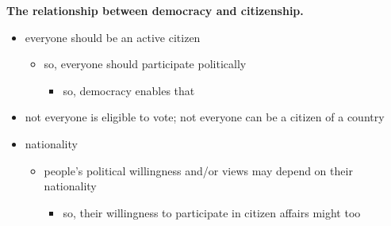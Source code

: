 \documentclass{article}
\begin{document}
	\textbf{The relationship between democracy and citizenship.}
	
	\begin{itemize}
		\item{everyone should be an active citizen}
		\begin{itemize}
			\item{so, everyone should participate politically}
			\begin{itemize}
				\item{so, democracy enables that}
			\end{itemize}
		\end{itemize}
	\end{itemize}
	
	\begin{itemize}
		\item{not everyone is eligible to vote; not everyone can be a citizen of a country}
	\end{itemize}
	
	\begin{itemize}
		\item{nationality}
		\begin{itemize}
			\item{people's political willingness and/or views may depend on their\\ nationality}
			\begin{itemize}
				\item{so, their willingness to participate in citizen affairs might too}
			\end{itemize}
		\end{itemize}
	\end{itemize}
\end{document}
